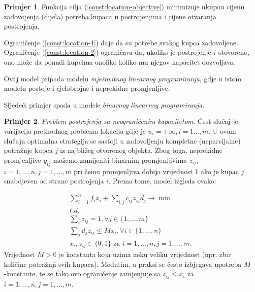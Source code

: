 \documentclass[a4paper, utf8, 11pt, colorlinks]{book}
\theoremstyle{definition}
\newtheorem{primjer}{Primjer}[chapter]
\begin{document}
\begin{primjer}
Funkcija cilja (\ref{const:location-objective}) minimizuje ukupnu cijenu zadovojenja  (dijela) potreba kupaca u postrojenjima i cijene otvaranja postrojenja. 

Ograničenje (\ref{const:location-1}) daje da su potrebe svakog kupca zadovoljene.  
Ograničenje (\ref{const:location-2}) ograničava da, ukoliko je postrojenje $i$ otovoreno, ono može da ponudi kupcima onoliko koliko mu njegov kapacitet dozvoljava.  


Ovaj model pripada modelu \emph{mješovitnog linearnog programiranja}, gdje u istom modelu postoje i cjelobrojne i neprekidne promjenljive.
\end{primjer}

Sljedeći primjer spada u modele \emph{binarnog linearnog programiranja}. 

\begin{primjer}
	
\emph{Problem postrojenja sa neograničenim kapacitetom.}
Čest slučaj je varijacija prethodnog problema lokacija gdje je $ u_{i} = + \infty,i=1\ldots,m$. U ovom slučaju optimalna strategija se sastoji u zadovoljenju kompletne (neparcijalne) potražnje kupca $j$ iz najbližeg otvorenog objekta. Zbog toga, neprekidne promjenljive  $y_{ij}$ možemo zamijeniti binarnim promjenljivima $z_{ij}$, $i=1,\ldots,n, j=1,\ldots,m$ pri čemu promjenljiva dobija vrijednost 1 ako je kupac $j$ snabdjeven od strane postrojenja $i$. Prema tome, model izgleda ovako:

\begin{align*}
	&\sum_{i=1}^n f_i x_i  + \sum_{i,j} c_{ij} z_{ij} d_j \rightarrow \min\\
	& t.d. \nonumber \\
	& \sum_{i} z_{ij} = 1, \forall j\in\{1,\ldots,m\} \\
	& \sum_{j} d_j z_{ij} \leq M x_i, \forall i \in \{1,\ldots,n\} \\
	& x_i, z_{ij} \in \{0,1\} \mbox{ za } i = 1, \ldots, n, j = 1,  \ldots, m.
\end{align*}
Vrijednost $M>0$ je konstanta koja uzima neku veliku vrijednost (npr. zbir količine potražnji svih kupaca). Međutim, u praksi se često  izbjegava upotreba $M$-konstante, te se tako 
 ovo ograničenje zamjenjuje sa $ z_{ij} \leq x_i$ 
za $ i = 1, \ldots, n, j = 1,  \ldots, m$. %
\end{primjer}
\end{document}
